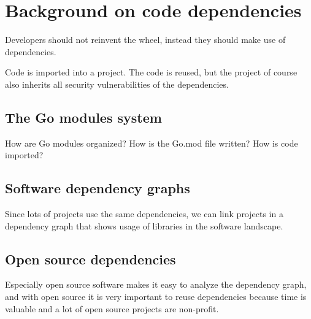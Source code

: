 
\chapter{Background on code dependencies}\label{ch:code-dependencies}

Developers should not reinvent the wheel, instead they should make use of dependencies.

Code is imported into a project. The code is reused, but the project of course also inherits
all security vulnerabilities of the dependencies.



\section{The Go modules system}\label{sec:go-modules}

How are Go modules organized? How is the Go.mod file written? How is code imported?



\section{Software dependency graphs}\label{sec:dependency-graphs}

Since lots of projects use the same dependencies, we can link projects in a dependency
graph that shows usage of libraries in the software landscape.



\section{Open source dependencies}\label{sec:open-source-dependencies}

Especially open source software makes it easy to analyze the dependency graph, and with
open source it is very important to reuse dependencies because time is valuable and a lot
of open source projects are non-profit.
